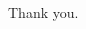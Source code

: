 \begin{paracol}{2}
  \begin{leftcolumn}

\null
\vfill
\begin{ally}
Thank you.
\end{ally}
\vfill
\newpage

\end{leftcolumn}
\end{paracol}
